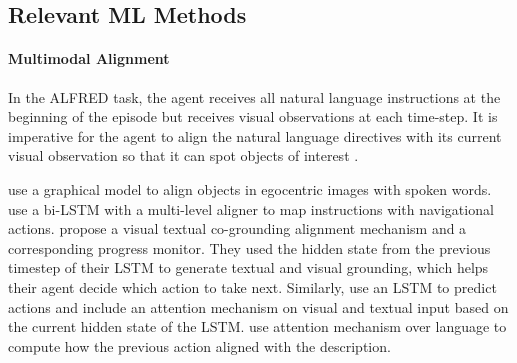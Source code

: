 \documentclass[11pt,a4paper]{article}
\newcommand{\as}[1]{\textcolor{red}{\bf\small [#1 --AS]}}
\begin{document}
\subsection{Relevant ML Methods}
\paragraph{Multimodal Alignment}
\label{ssec:mmml}
In the ALFRED task, the agent receives all natural language instructions at the beginning of the episode but receives visual observations at each time-step. It is imperative for the agent to align the natural language directives with its current visual observation so that it can spot objects of interest \cite{baltruvsaitis2018multimodal}.

 use a graphical model to align objects in egocentric images with spoken words.  use a bi-LSTM with a multi-level aligner to map instructions with navigational actions.  propose a visual textual co-grounding alignment mechanism and a corresponding progress monitor. They used the hidden state from the previous timestep of their LSTM to generate textual and visual grounding, which helps their agent decide which action to take next. Similarly,  use an LSTM to predict actions and include an attention mechanism on visual and textual input based on the current hidden state of the LSTM.  use attention mechanism over language to compute how the previous action aligned with the description.

\end{document}
